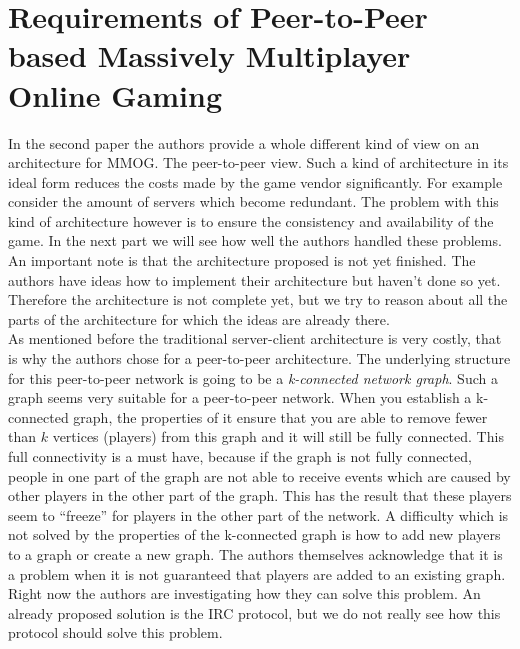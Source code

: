 \section*{Requirements of Peer-to-Peer based Massively Multiplayer Online Gaming}
In the second paper the authors \cite{peer} provide a whole different kind of view on an architecture for MMOG. 
The peer-to-peer view. 
Such a kind of architecture in its ideal form reduces the costs made by the game vendor significantly. 
For example consider the amount of servers which become redundant. 
The problem with this kind of architecture however is to ensure the consistency and availability of the game. 
In the next part we will see how well the authors handled these problems. 
An important note is that the architecture proposed is not yet finished. 
The authors have ideas how to implement their architecture but haven't done so yet. 
Therefore the architecture is not complete yet, but we try to reason about all the parts of the architecture for which the ideas are already there.\\

As mentioned before the traditional server-client architecture is very costly, that is why the authors chose for a peer-to-peer architecture. 
The underlying structure for this peer-to-peer network is going to be a \emph{k-connected network graph}. 
Such a graph seems very suitable for a peer-to-peer network. 
When you establish a k-connected graph, the properties of it ensure that you are able to remove fewer than $k$ vertices (players) from this graph and it will still be fully connected. 
This full connectivity is a must have, because if the graph is not fully connected, people in one part of the graph are not able to receive events which are caused by other players in the other part of the graph.
This has the result that these players seem to ``freeze'' for players in the other part of the network. 
A difficulty which is not solved by the properties of the k-connected graph is how to add new players to a graph or create a new graph. 
The authors themselves acknowledge that it is a problem when it is not guaranteed that players are added to an existing graph. 
Right now the authors are investigating how they can solve this problem. 
An already proposed solution is the IRC protocol, but we do not really see how this protocol should solve this problem.\\

